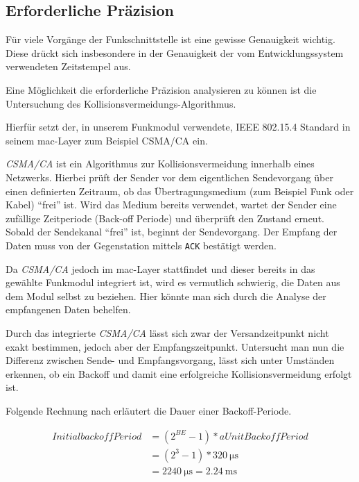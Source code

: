 \subsection{Erforderliche Präzision}\label{subs:praezision}
Für viele Vorgänge der Funkschnittstelle ist eine gewisse Genauigkeit wichtig.
Diese drückt sich insbesondere in der Genauigkeit der vom Entwicklungssystem
verwendeten Zeitstempel aus.

Eine Möglichkeit die erforderliche Präzision analysieren zu können ist die
Untersuchung des Kollisionsvermeidungs-Algorithmus.

Hierfür setzt der, in unserem Funkmodul verwendete, IEEE 802.15.4 Standard in
seinem \gls{mac}-Layer zum Beispiel CSMA/CA ein\cite{IEEE01}.
\begin{definition}[CSMA/CA]
\emph{CSMA/CA} ist ein Algorithmus zur Kollisionsvermeidung innerhalb eines
Netzwerks. Hierbei prüft der Sender vor dem eigentlichen Sendevorgang über
einen definierten Zeitraum, ob das Übertragungsmedium (zum Beispiel Funk oder
Kabel) "`frei"' ist. Wird das Medium bereits verwendet, wartet der Sender
eine zufällige Zeitperiode (Back-off Periode) und überprüft den Zustand erneut.
Sobald der Sendekanal "`frei"' ist, beginnt der Sendevorgang. Der Empfang der Daten muss
von der Gegenstation mittels \texttt{ACK} bestätigt werden.
\end{definition}
Da \emph{CSMA/CA} jedoch im \gls{mac}-Layer stattfindet und dieser bereits
in das gewählte Funkmodul integriert ist, wird es vermutlich schwierig,
die Daten aus dem Modul selbst zu beziehen. Hier könnte man sich durch
die Analyse der empfangenen Daten behelfen.

Durch das integrierte \emph{CSMA/CA} lässt sich zwar der Versandzeitpunkt nicht
exakt bestimmen, jedoch aber der Empfangszeitpunkt. Untersucht man nun die
Differenz zwischen Sende- und Empfangsvorgang, lässt sich unter Umständen
erkennen, ob ein Backoff und damit eine erfolgreiche Kollisionsvermeidung
erfolgt ist.

Folgende Rechnung nach\cite{JENN} erläutert die Dauer einer Backoff-Periode.

\begin{align}\label{calc:init}
\mathit{InitialbackoffPeriod} &=(2^{BE}-1)*\mathit{aUnitBackoffPeriod} \\
&=(2^3-1)*\SI{320}{\micro\second}\nonumber \\
&= \SI{2240}{\micro\second} = \SI{2,24}{\milli\second} \nonumber 
\end{align}

